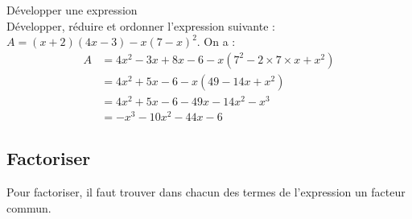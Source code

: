 \begin{Méthode}Développer une expression\\
Développer, réduire et ordonner l'expression suivante : 
$A=(x+2)(4x-3)-x(7-x)^2$.
On a : 
\begin{align*}
A&=4x^2-3x+8x-6-x(7^2-2\times 7 \times x+x^2)\\
&=4x^2+5x-6-x(49-14x+x^2)\\
&=4x^2+5x-6-49x-14x^2-x^3\\
&=-x^3-10x^2-44x-6
\end{align*}
\end{Méthode}

\newpage

\subsection{Factoriser}

\noindent Pour factoriser, il faut trouver dans chacun des termes de l'expression un {\textcolor{Couleur8}{facteur commun}}.

